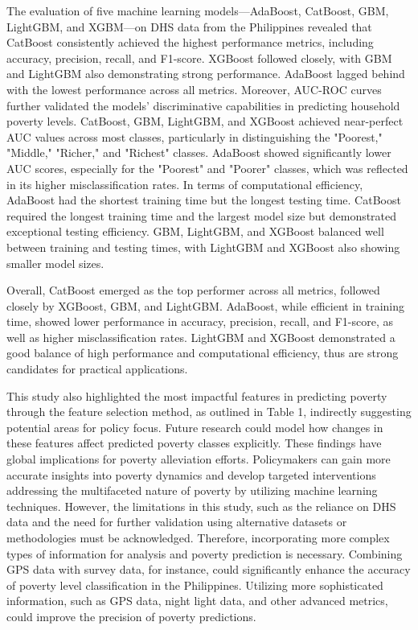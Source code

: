 \documentclass[a4paper,fleqn]{cas-sc}
\begin{document}
The evaluation of five machine learning models—AdaBoost, CatBoost, GBM, LightGBM, and XGBM—on DHS data from the Philippines revealed that CatBoost consistently achieved the highest performance metrics, including accuracy, precision, recall, and F1-score. XGBoost followed closely, with GBM and LightGBM also demonstrating strong performance. AdaBoost lagged behind with the lowest performance across all metrics. Moreover, AUC-ROC curves further validated the models' discriminative capabilities in predicting household poverty levels. CatBoost, GBM, LightGBM, and XGBoost achieved near-perfect AUC values across most classes, particularly in distinguishing the "Poorest," "Middle," "Richer," and "Richest" classes. AdaBoost showed significantly lower AUC scores, especially for the "Poorest" and "Poorer" classes, which was reflected in its higher misclassification rates. In terms of computational efficiency, AdaBoost had the shortest training time but the longest testing time. CatBoost required the longest training time and the largest model size but demonstrated exceptional testing efficiency. GBM, LightGBM, and XGBoost balanced well between training and testing times, with LightGBM and XGBoost also showing smaller model sizes.

Overall, CatBoost emerged as the top performer across all metrics, followed closely by XGBoost, GBM, and LightGBM. AdaBoost, while efficient in training time, showed lower performance in accuracy, precision, recall, and F1-score, as well as higher misclassification rates. LightGBM and XGBoost demonstrated a good balance of high performance and computational efficiency, thus are strong candidates for practical applications.

This study also highlighted the most impactful features in predicting poverty through the feature selection method, as outlined in Table 1, indirectly suggesting potential areas for policy focus. Future research could model how changes in these features affect predicted poverty classes explicitly. These findings have global implications for poverty alleviation efforts. Policymakers can gain more accurate insights into poverty dynamics and develop targeted interventions addressing the multifaceted nature of poverty by utilizing machine learning techniques. However, the limitations in this study, such as the reliance on DHS data and the need for further validation using alternative datasets or methodologies must be acknowledged. Therefore, incorporating more complex types of information for analysis and poverty prediction is necessary. Combining GPS data with survey data, for instance, could significantly enhance the accuracy of poverty level classification in the Philippines. Utilizing more sophisticated information, such as GPS data, night light data, and other advanced metrics, could improve the precision of poverty predictions.
\end{document}
